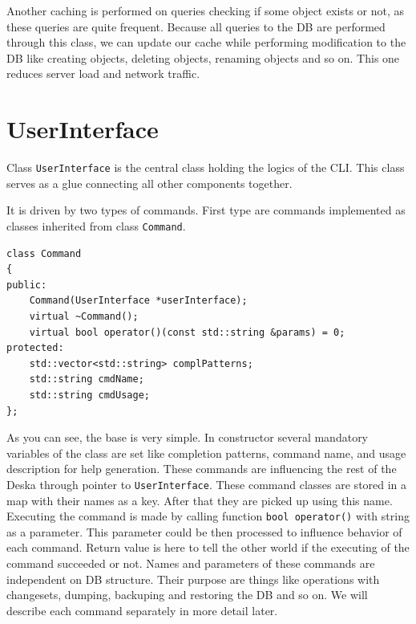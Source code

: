 \documentclass[deska]{subfiles}
\begin{document}
Another caching is performed on queries checking if some object exists or not, as these queries are quite frequent.
Because all queries to the DB are performed through this class, we can update our cache while performing modification to
the DB like creating objects, deleting objects, renaming objects and so on. This one reduces server load and network traffic.

\section{UserInterface}

Class {\tt UserInterface} is the central class holding the logics of the CLI. This class serves as a glue connecting
all other components together.

It is driven by two types of commands. First type are commands implemented as classes inherited from class {\tt Command}.

\begin{verbatim}
class Command
{
public:
    Command(UserInterface *userInterface);
    virtual ~Command();
    virtual bool operator()(const std::string &params) = 0;
protected:
    std::vector<std::string> complPatterns;
    std::string cmdName;
    std::string cmdUsage;
};
\end{verbatim}

As you can see, the base is very simple. In constructor several mandatory variables of the class are set like
completion patterns, command name, and usage description for help generation. These commands are influencing the rest of
the Deska through pointer to {\tt UserInterface}. These command classes are stored in a map with their names as a key.
After that they are picked up using this name. Executing the command is made by calling function {\tt bool operator()} with
string as a parameter. This parameter could be then processed to influence behavior of each command. Return value is here
to tell the other world if the executing of the command succeeded or not. Names and parameters of these commands
are independent on DB structure. Their purpose are things like operations with changesets, dumping, backuping and restoring
the DB and so on. We will describe each command separately in more detail later.
\end{document}
